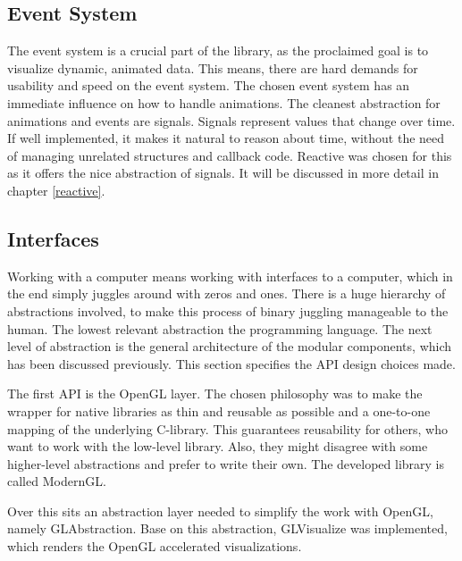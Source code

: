 \subsection{Event System}
The event system is a crucial part of the library, as the proclaimed goal is to visualize dynamic, animated data.
This means, there are hard demands for usability and speed on the event system.
The chosen event system has an immediate influence on how to handle animations. 
The cleanest abstraction for animations and events are signals. Signals represent values that change over time.
If well implemented, it makes it natural to reason about time, without the need of managing unrelated structures and callback code.
Reactive\cite{Reactive} was chosen for this as it offers the nice abstraction of signals. It will be discussed in more detail in chapter \ref{reactive}.

\subsection{Interfaces}

Working with a computer means working with interfaces to a computer, which in the end simply juggles around with zeros and ones. There is a huge hierarchy of abstractions involved, to make this process of binary juggling manageable to the human.
The lowest relevant abstraction the programming language.
The next level of abstraction is the general architecture of the modular components, which has been discussed previously. 
This section specifies the \ac{API} design choices made.

The first \ac{API} is the \ac{OpenGL} layer. 
The chosen philosophy was to make the wrapper for native libraries as thin and reusable as possible and a one-to-one mapping of the underlying C-library.
This guarantees reusability for others, who want to work with the low-level library. Also, they might disagree with some higher-level abstractions and prefer to write their own.
The developed library is called ModernGL\cite{ModernGL}.

Over this sits an abstraction layer needed to simplify the work with \ac{OpenGL}, namely GLAbstraction\cite{GLAbstraction}.
Base on this abstraction, GLVisualize\cite{GLVisualize} was implemented, which renders the \ac{OpenGL} accelerated visualizations.

